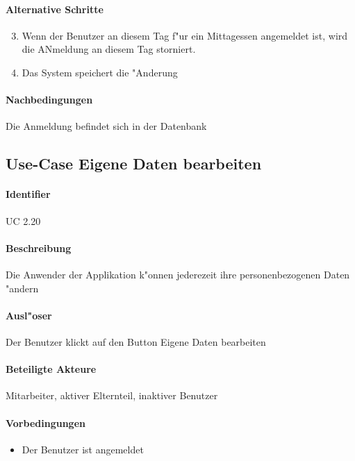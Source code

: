   \paragraph{Alternative Schritte}
  \begin{enumerate}
  \setcounter{enumi}{2}
   \item  Wenn der Benutzer an diesem Tag f"ur ein Mittagessen angemeldet ist, wird die ANmeldung an diesem Tag storniert.
   \item Das System speichert die "Anderung
  \end{enumerate}

  \paragraph{Nachbedingungen}
  Die Anmeldung befindet sich in der Datenbank

  
    \newpage
 \subsection{Use-Case Eigene Daten bearbeiten}
  \paragraph{Identifier}
  UC 2.20
  \paragraph{Beschreibung}
  Die Anwender der Applikation k"onnen jederezeit ihre personenbezogenen Daten "andern
  \paragraph{Ausl"oser}
  Der Benutzer klickt auf den Button \dq Eigene Daten bearbeiten\dq
  \paragraph{Beteiligte Akteure}   \leavevmode \newline
    Mitarbeiter, aktiver Elternteil, inaktiver Benutzer
  \paragraph{Vorbedingungen}
  \begin{itemize}
   \item Der Benutzer ist angemeldet
  \end{itemize}


